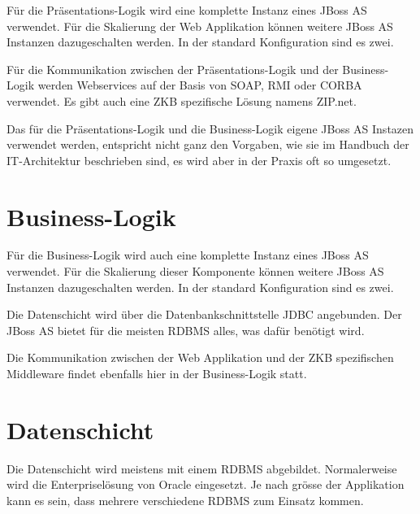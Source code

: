   Für die Präsentations-Logik wird eine komplette Instanz eines JBoss AS
  verwendet. Für die Skalierung der Web Applikation können weitere
  JBoss AS Instanzen dazugeschalten werden. In der standard Konfiguration sind
  es zwei.
  
  Für die Kommunikation zwischen der Präsentations-Logik und der Business-Logik
  werden Webservices auf der Basis von \ac{SOAP}, \ac{RMI} oder \ac{CORBA}
  verwendet. Es gibt auch eine \ac{ZKB} spezifische Lösung namens ZIP.net.
  
  Das für die Präsentations-Logik und die Business-Logik eigene JBoss AS
  Instazen verwendet werden, entspricht nicht ganz den Vorgaben, wie sie
  im Handbuch der IT-Architektur beschrieben sind, es wird aber in der Praxis
  oft so umgesetzt.
    
  \section{Business-Logik}
  
  Für die Business-Logik wird auch eine komplette Instanz eines JBoss AS
  verwendet. Für die Skalierung dieser Komponente können weitere JBoss AS
  Instanzen dazugeschalten werden. In der standard Konfiguration sind es zwei.
  
  Die Datenschicht wird über die Datenbankschnittstelle \ac{JDBC} angebunden.
  Der JBoss AS bietet für die meisten \ac{RDBMS} alles, was dafür benötigt
  wird.
  
  Die Kommunikation zwischen der Web Applikation und der ZKB spezifischen
  Middleware findet ebenfalls hier in der Business-Logik statt.
  
  \section{Datenschicht}
  
  Die Datenschicht wird meistens mit einem \ac{RDBMS} abgebildet. Normalerweise
  wird die Enterpriselösung von Oracle eingesetzt. Je nach grösse der
  Applikation kann es sein, dass mehrere verschiedene \ac{RDBMS} zum Einsatz
  kommen.

